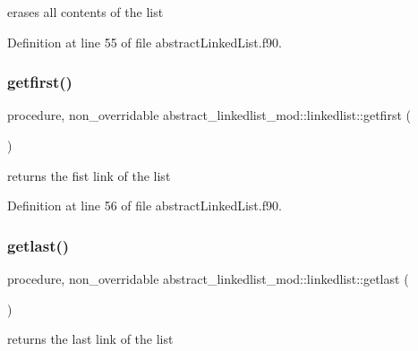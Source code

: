 erases all contents of the list 



Definition at line 55 of file abstract\+Linked\+List.\+f90.

\mbox{\label{structabstract__linkedlist__mod_1_1linkedlist_ae96f8c00f41925064249e443ce31f44a}} 
\subsubsection{\texorpdfstring{getfirst()}{getfirst()}}
{\footnotesize\ttfamily procedure, non\+\_\+overridable abstract\+\_\+linkedlist\+\_\+mod\+::linkedlist\+::getfirst (\begin{DoxyParamCaption}{ }\end{DoxyParamCaption})\hspace{0.3cm}{\ttfamily [private]}}



returns the fist link of the list 



Definition at line 56 of file abstract\+Linked\+List.\+f90.

\mbox{\label{structabstract__linkedlist__mod_1_1linkedlist_a17366518d094a62e8e68fa4c5681810c}} 
\subsubsection{\texorpdfstring{getlast()}{getlast()}}
{\footnotesize\ttfamily procedure, non\+\_\+overridable abstract\+\_\+linkedlist\+\_\+mod\+::linkedlist\+::getlast (\begin{DoxyParamCaption}{ }\end{DoxyParamCaption})\hspace{0.3cm}{\ttfamily [private]}}



returns the last link of the list 



